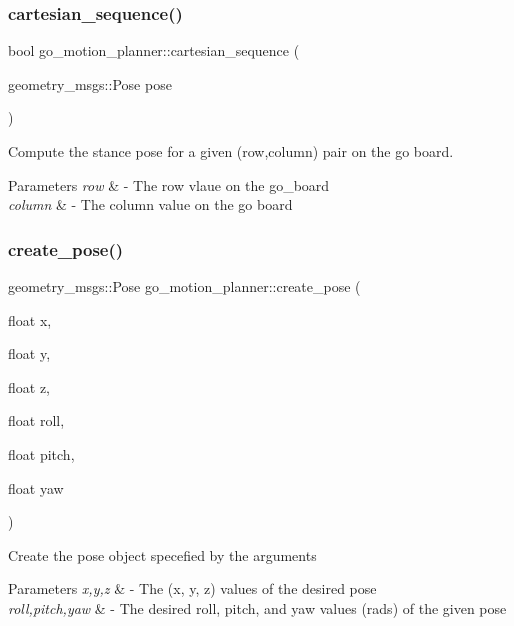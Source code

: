 \subsubsection{\texorpdfstring{cartesian\+\_\+sequence()}{cartesian\_sequence()}}
{\footnotesize\ttfamily bool go\+\_\+motion\+\_\+planner\+::cartesian\+\_\+sequence (\begin{DoxyParamCaption}\item[{geometry\+\_\+msgs\+::\+Pose}]{pose }\end{DoxyParamCaption})}



Compute the stance pose for a given (row,column) pair on the go board. 


\begin{DoxyParams}{Parameters}
{\em row} & -\/ The row vlaue on the go\+\_\+board \\
\hline
{\em column} & -\/ The column value on the go board \\
\hline
\end{DoxyParams}
\mbox{\label{classgo__motion__planner_a74e2e97851998d7f6b8c29f31e0adfb0}} 
\subsubsection{\texorpdfstring{create\+\_\+pose()}{create\_pose()}}
{\footnotesize\ttfamily geometry\+\_\+msgs\+::\+Pose go\+\_\+motion\+\_\+planner\+::create\+\_\+pose (\begin{DoxyParamCaption}\item[{float}]{x,  }\item[{float}]{y,  }\item[{float}]{z,  }\item[{float}]{roll,  }\item[{float}]{pitch,  }\item[{float}]{yaw }\end{DoxyParamCaption})}




\begin{DoxyItemize}
\item Create the pose object specefied by the arguments 
\end{DoxyItemize}


\begin{DoxyParams}{Parameters}
{\em x,y,z} & -\/ The (x, y, z) values of the desired pose \\
\hline
{\em roll,pitch,yaw} & -\/ The desired roll, pitch, and yaw values (rads) of the given pose \\
\hline
\end{DoxyParams}
\mbox{\label{classgo__motion__planner_a70e5bea73ba3ec12f0d91d107c58dec1}} 
